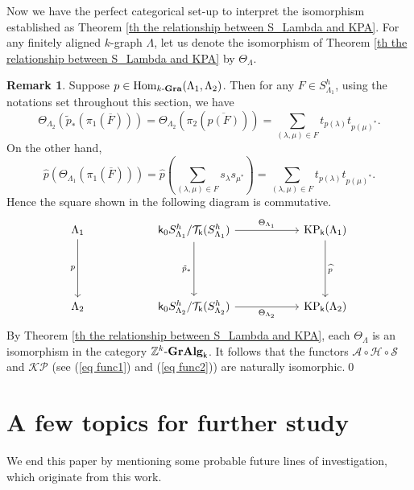 \documentclass[a4paper,reqno,11pt]{amsart}
\numberwithin{equation}{section}
\theoremstyle{definition}
\newtheorem{rmk}[thm]{Remark}
\theoremstyle{remark}
\newcommand{\Hom}{\operatorname{Hom}}
\newcommand{\KP}{\operatorname{KP}}
\begin{document}
Now we have the perfect categorical set-up to interpret the isomorphism established as Theorem \ref{th the relationship between S_Lambda and KPA}. For any finitely aligned $k$-graph $\Lambda$, let us denote the isomorphism of Theorem \ref{th the relationship between S_Lambda and KPA} by $\Theta_\Lambda$. 
\begin{rmk}\label{rem the natural isomorphism}
Suppose $p\in \Hom_{k\textup{-\textbf{Gra}}}(\Lambda_1,\Lambda_2)$. Then for any $F\in S_{\Lambda_1}^h$, using the notations set throughout this section, we have \[\Theta_{\Lambda_2}\left(\tilde{p}_*\left(\pi_1\left(\overline{F}\right)\right)\right)=\Theta_{\Lambda_2}\left(\pi_2\left(\overline{p(F)}\right)\right)=\displaystyle{\sum_{(\lambda,\mu)\in F}}t_{p(\lambda)}t_{p(\mu)^*}.\] On the other hand, \[\widehat{p}\left(\Theta_{\Lambda_1}\left(\pi_1\left(\overline{F}\right)\right)\right)=\widehat{p}\left(\displaystyle{\sum_{(\lambda,\mu)\in F}}s_\lambda s_{\mu^*}\right)=\displaystyle{\sum_{(\lambda,\mu)\in F}}t_{p(\lambda)}t_{p(\mu)^*}.\] Hence the square shown in the following diagram is commutative.
\[
\begin{tikzcd}[
  column sep=2cm,
  row sep=1.7cm
]
\Lambda_1
  \arrow[d, "p"']
&
\mathsf{k}_0S_{\Lambda_1}^h/{\mathcal{T}_\mathsf{k}(S_{\Lambda_1}^h)}
  \arrow[d, "\tilde{p}_*"']
  \arrow[r, "\Theta_{\Lambda_1}"]
&
\KP_\mathsf{k}(\Lambda_1)
  \arrow[d, "\widehat{p}"]
\\
\Lambda_2
&
\mathsf{k}_0S_{\Lambda_2}^h/{\mathcal{T}_\mathsf{k}(S_{\Lambda_2}^h)}
  \arrow[r, "\Theta_{\Lambda_2}"']
&
\KP_\mathsf{k}(\Lambda_2)
\end{tikzcd}
\]
By Theorem \ref{th the relationship between S_Lambda and KPA}, each $\Theta_\Lambda$ is an isomorphism in the category $\mathbb{Z}^k\textup{-\textbf{GrAlg}}_\mathsf{k}$. It follows that the functors $\mathcal{A}\circ \mathcal{H}\circ \mathcal{S}$ and $\mathcal{K}\mathcal{P}$ (see (\ref{eq func1}) and (\ref{eq func2})) are naturally isomorphic.\qed 
\end{rmk}

\section{A few topics for further study}\label{sec future scopes}
We end this paper by mentioning some probable future lines of investigation, which originate from this work.
\end{document}
